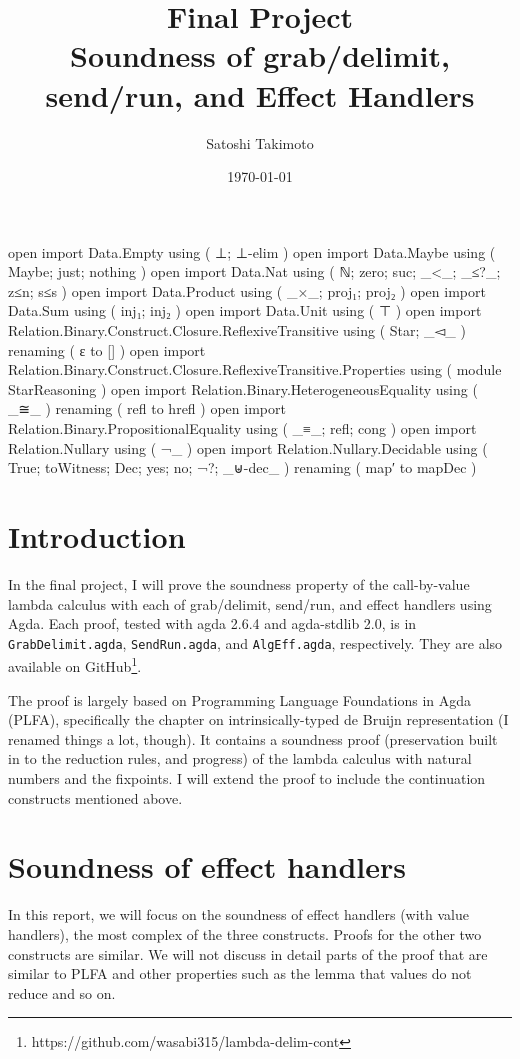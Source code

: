 \documentclass[a4paper,11pt]{article}
\title{{\large{Final Project}}\\Soundness of grab/delimit, send/run, and Effect Handlers}
\date{\today}
\author{Satoshi Takimoto}
\begin{document}
\maketitle

\begin{code}[hide]
open import Data.Empty using ( ⊥; ⊥-elim )
open import Data.Maybe using ( Maybe; just; nothing )
open import Data.Nat using ( ℕ; zero; suc; _<_; _≤?_; z≤n; s≤s )
open import Data.Product using ( _×_; proj₁; proj₂ )
open import Data.Sum using ( inj₁; inj₂ )
open import Data.Unit using ( ⊤ )
open import Relation.Binary.Construct.Closure.ReflexiveTransitive using ( Star; _◅_ ) renaming ( ε to [] )
open import Relation.Binary.Construct.Closure.ReflexiveTransitive.Properties using ( module StarReasoning )
open import Relation.Binary.HeterogeneousEquality using ( _≅_ ) renaming ( refl to hrefl )
open import Relation.Binary.PropositionalEquality using ( _≡_; refl; cong )
open import Relation.Nullary using ( ¬_ )
open import Relation.Nullary.Decidable
  using ( True; toWitness; Dec; yes; no; ¬?; _⊎-dec_ )
  renaming ( map′ to mapDec )
\end{code}

\section{Introduction}

In the final project, I will prove the soundness property of the call-by-value lambda calculus with each of grab/delimit, send/run, and effect handlers using Agda.
Each proof, tested with agda 2.6.4 and agda-stdlib 2.0, is in \texttt{GrabDelimit.agda}, \texttt{SendRun.agda}, and \texttt{AlgEff.agda}, respectively.
They are also available on GitHub\footnote[1]{https://github.com/wasabi315/lambda-delim-cont}.

The proof is largely based on Programming Language Foundations in Agda (PLFA)\cite{plfa22.08}, specifically the chapter on intrinsically-typed de Bruijn representation (I renamed things a lot, though). It contains a soundness proof (preservation built in to the reduction rules, and progress) of the lambda calculus with natural numbers and the fixpoints. I will extend the proof to include the continuation constructs mentioned above.

\section{Soundness of effect handlers}

In this report, we will focus on the soundness of effect handlers (with value handlers), the most complex of the three constructs. Proofs for the other two constructs are similar. We will not discuss in detail parts of the proof that are similar to PLFA and other properties such as the lemma that values do not reduce and so on.
\end{document}
